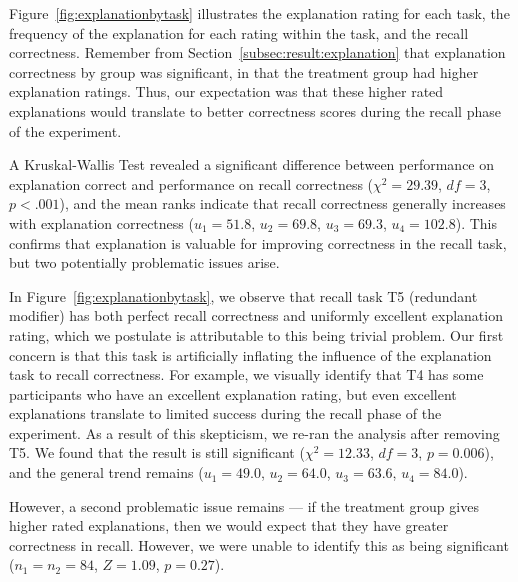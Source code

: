 \documentclass[conference]{IEEEtran}
\begin{document}
Figure~\ref{fig:explanationbytask} illustrates the explanation rating for each task, the frequency of the explanation for each rating within the task, and the recall correctness. Remember from Section~\ref{subsec:result:explanation} that explanation correctness by group was significant, in that the treatment group had higher explanation ratings. Thus, our expectation was that these higher rated explanations would translate to better correctness scores during the recall phase of the experiment.

A Kruskal-Wallis Test revealed a significant difference between performance on explanation correct and performance on recall correctness ($\chi^2 = 29.39$, $df = 3$, $p < .001$), and the mean ranks indicate that recall correctness generally increases with explanation correctness ($u_1 = 51.8$, $u_2 = 69.8$, $u_3 = 69.3$, $u_4 = 102.8$). This confirms that explanation is valuable for improving correctness in the recall task, but two potentially problematic issues arise.

In Figure~\ref{fig:explanationbytask}, we observe that recall task T5 (redundant modifier) has both perfect recall correctness and uniformly excellent explanation rating, which we postulate is attributable to this being trivial problem. Our first concern is that this task is artificially inflating the influence of the explanation task to recall correctness. For example, we visually identify that T4 has some participants who have an excellent explanation rating, but even excellent explanations translate to limited success during the recall phase of the experiment. As a result of this skepticism, we re-ran the analysis after removing T5. We found that the result is still significant ($\chi^2 = 12.33$, $df = 3$, $p = 0.006$), and the general trend remains ($u_1 = 49.0$, $u_2 = 64.0$, $u_3 = 63.6$, $u_4 = 84.0$).


However, a second problematic issue remains --- if the treatment group gives higher rated explanations, then we would expect that they have greater correctness in recall. However, we were unable to identify this as being significant ($n_1 = n_2 = 84$, $Z = 1.09$, $p = 0.27$).
\end{document}

